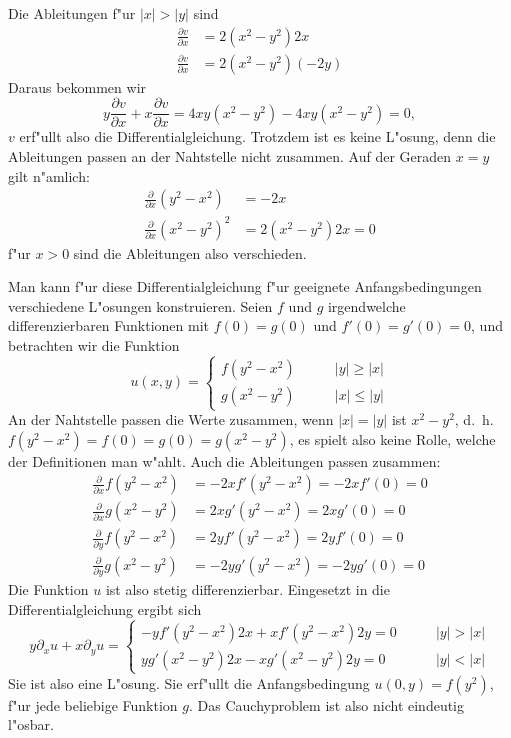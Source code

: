 \begin{loesung}
\begin{teilaufgaben}
\item
Die Ableitungen f"ur $|x|>|y|$ sind
\begin{align*}
\frac{\partial v}{\partial x}
&=2(x^2-y^2)2x\\
\frac{\partial v}{\partial x}
&=2(x^2-y^2)(-2y)
\end{align*}
Daraus bekommen wir
\[
y\frac{\partial v}{\partial x}
+
x \frac{\partial v}{\partial x}
=
4xy(x^2-y^2)
-4xy(x^2-y^2)=0,
\]
$v$ erf"ullt also die Differentialgleichung.
Trotzdem ist es keine
L"osung, denn die Ableitungen passen an der Nahtstelle nicht zusammen.
Auf der Geraden $x=y$ gilt n"amlich:
\begin{align*}
\frac{\partial}{\partial x}(y^2-x^2)&=-2x\\
\frac{\partial}{\partial x}(x^2-y^2)^2&=2(x^2-y^2)2x=0
\end{align*}
f"ur $x>0$ sind die Ableitungen also verschieden.
\end{teilaufgaben}

Man kann f"ur diese Differentialgleichung f"ur geeignete Anfangsbedingungen
verschiedene L"osungen konstruieren. Seien $f$ und $g$ irgendwelche
differenzierbaren Funktionen mit $f(0)=g(0)$ und $f'(0)=g'(0)=0$,
und betrachten wir die Funktion
\[
u(x,y)=\begin{cases}
f(y^2-x^2)&\qquad |y|\ge|x|\\
g(x^2-y^2)&\qquad |x|\le|y|
\end{cases}
\]
An der Nahtstelle passen die Werte zusammen, wenn $|x|=|y|$ ist $x^2-y^2$,
d.~h.~$f(y^2-x^2)=f(0)=g(0)=g(x^2-y^2)$, es spielt also keine Rolle, welche
der Definitionen man w"ahlt.
Auch die Ableitungen passen zusammen:
\begin{align*}
\frac{\partial}{\partial x}f(y^2-x^2)&=-2xf'(y^2-x^2)=-2xf'(0)=0
\\
\frac{\partial}{\partial x}g(x^2-y^2)&=2xg'(y^2-x^2)=2xg'(0)=0
\\
\frac{\partial}{\partial y}f(y^2-x^2)&=2yf'(y^2-x^2)=2yf'(0)=0
\\
\frac{\partial}{\partial y}g(x^2-y^2)&=-2yg'(y^2-x^2)=-2yg'(0)=0
\end{align*}
Die Funktion $u$ ist also stetig differenzierbar.
Eingesetzt in die Differentialgleichung ergibt sich
\[
y\partial_xu+x\partial_yu
=
\begin{cases}
-yf'(y^2-x^2)2x+xf'(y^2-x^2)2y=0&\qquad |y|>|x|\\
yg'(x^2-y^2)2x-xg'(x^2-y^2)2y=0&\qquad |y|<|x|
\end{cases}
\]
Sie ist also eine L"osung. Sie erf"ullt die Anfangsbedingung
$u(0,y)=f(y^2)$, f"ur jede beliebige Funktion $g$. Das Cauchyproblem
ist also nicht eindeutig l"osbar.


\end{loesung}
